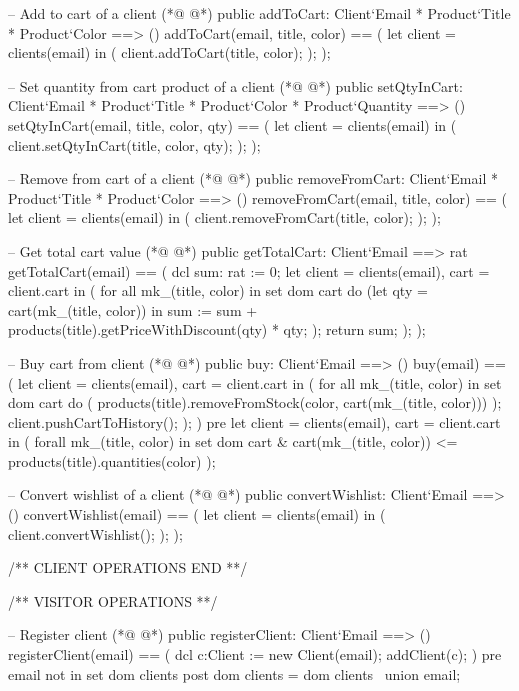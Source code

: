 \begin{vdmpp}[breaklines=true]
 -- Add to cart of a client
(*@
\label{addToCart:146}
@*)
 public addToCart: Client`Email * Product`Title * Product`Color ==> ()
 addToCart(email, title, color) == (
  let client = clients(email)
  in (
   client.addToCart(title, color);
  );
 );
 
 -- Set quantity from cart product of a client
(*@
\label{setQtyInCart:155}
@*)
 public setQtyInCart: Client`Email * Product`Title * Product`Color * Product`Quantity ==> ()
 setQtyInCart(email, title, color, qty) == (
  let client = clients(email)
  in (
   client.setQtyInCart(title, color, qty);
  );
 );
 
 -- Remove from cart of a client
(*@
\label{removeFromCart:164}
@*)
 public removeFromCart: Client`Email * Product`Title * Product`Color ==> ()
 removeFromCart(email, title, color) == (
  let client = clients(email)
  in (
   client.removeFromCart(title, color);
  );
 );
 
 -- Get total cart value
(*@
\label{getTotalCart:173}
@*)
 public getTotalCart: Client`Email ==> rat
 getTotalCart(email) == (
  dcl sum: rat := 0;
  let client = clients(email), cart = client.cart
  in (
   for all mk_(title, color) in set dom cart
    do (let qty = cart(mk_(title, color))
     in sum := sum + products(title).getPriceWithDiscount(qty) * qty;
    );
   return sum;
  );
 );
 
 -- Buy cart from client
(*@
\label{buy:187}
@*)
 public buy: Client`Email ==> ()
 buy(email) == (
  let client = clients(email), cart = client.cart
  in (
   for all mk_(title, color) in set dom cart
    do (
     products(title).removeFromStock(color, cart(mk_(title, color)))
    );
   client.pushCartToHistory();
  );
 )
 pre let client = clients(email), cart = client.cart
  in (
   forall mk_(title, color) in set dom cart
    & cart(mk_(title, color)) <= products(title).quantities(color)
  );
 
 -- Convert wishlist of a client
(*@
\label{convertWishlist:205}
@*)
 public convertWishlist: Client`Email ==> ()
 convertWishlist(email) == (
  let client = clients(email)
  in (
   client.convertWishlist();
  );
 );
 
 /** CLIENT OPERATIONS END **/
 
 
 /** VISITOR OPERATIONS **/
 
 -- Register client
(*@
\label{registerClient:219}
@*)
 public registerClient: Client`Email ==> ()
 registerClient(email) == (
 dcl c:Client := new Client(email);
  addClient(c);
 )
 pre email not in set dom clients
 post dom clients = dom clients~ union {email};


\end{vdmpp}
